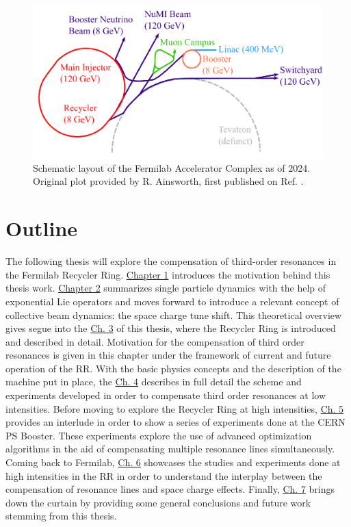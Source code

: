 \begin{figure}[H]
    \centering
    \includegraphics[width=\columnwidth]{chapter1/complex.png}
    \caption{Schematic layout of the Fermilab Accelerator Complex as of 2024. Original plot provided by R. Ainsworth, first published on Ref. \cite{rr1}.}
    \label{fig:fac}
 \end{figure}

\section{Outline}

The following thesis will explore the compensation of third-order resonances in the Fermilab Recycler Ring. \hyperref[sec:ch1]{Chapter 1} introduces the motivation behind this thesis work. \hyperref[sec:ch2]{Chapter 2} summarizes single particle dynamics with the help of exponential Lie operators and moves forward to introduce a relevant concept of collective beam dynamics: the space charge tune shift. This theoretical overview gives segue into the \hyperref[sec:ch3]{Ch. 3} of this thesis, where the Recycler Ring is introduced and described in detail. Motivation for the compensation of third order resonances is given in this chapter under the framework of current and future operation of the RR. With the basic physics concepts and the description of the machine put in place, the \hyperref[sec:ch4]{Ch. 4} describes in full detail the scheme and experiments developed in order to compensate third order resonances at low intensities. Before moving to explore the Recycler Ring at high intensities, \hyperref[sec:ch5]{Ch. 5} provides an interlude in order to show a series of experiments done at the CERN PS Booster. These experiments explore the use of advanced optimization algorithms in the aid of compensating multiple resonance lines simultaneously. Coming back to Fermilab, \hyperref[sec:ch6]{Ch. 6} showcases the studies and experiments done at high intensities in the RR in order to understand the interplay between the compensation of resonance lines and space charge effects. Finally, \hyperref[sec:ch7]{Ch. 7} brings down the curtain by providing some general conclusions and future work stemming from this thesis.